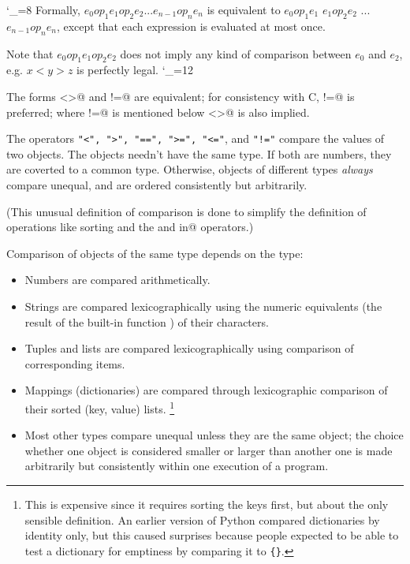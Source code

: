 \catcode`\_=8
Formally, $e_0 op_1 e_1 op_2 e_2 ...e_{n-1} op_n e_n$ is equivalent to
$e_0 op_1 e_1$ \verb@and@ $e_1 op_2 e_2$ \verb@and@ ... \verb@and@
$e_{n-1} op_n e_n$, except that each expression is evaluated at most once.

Note that $e_0 op_1 e_1 op_2 e_2$ does not imply any kind of comparison
between $e_0$ and $e_2$, e.g. $x < y > z$ is perfectly legal.
\catcode`\_=12

The forms \verb@<>@ and \verb@!=@ are equivalent; for consistency with
C, \verb@!=@ is preferred; where \verb@!=@ is mentioned below
\verb@<>@ is also implied.

The operators {\tt "<", ">", "==", ">=", "<="}, and {\tt "!="} compare
the values of two objects.  The objects needn't have the same type.
If both are numbers, they are coverted to a common type.  Otherwise,
objects of different types {\em always} compare unequal, and are
ordered consistently but arbitrarily.

(This unusual definition of comparison is done to simplify the
definition of operations like sorting and the \verb@in@ and
\verb@not in@ operators.)

Comparison of objects of the same type depends on the type:

\begin{itemize}

\item
Numbers are compared arithmetically.

\item
Strings are compared lexicographically using the numeric equivalents
(the result of the built-in function \verb@ord@) of their characters.

\item
Tuples and lists are compared lexicographically using comparison of
corresponding items.

\item
Mappings (dictionaries) are compared through lexicographic
comparison of their sorted (key, value) lists.%
\footnote{This is expensive since it requires sorting the keys first,
but about the only sensible definition.  An earlier version of Python
compared dictionaries by identity only, but this caused surprises
because people expected to be able to test a dictionary for emptiness
by comparing it to {\tt \{\}}.}

\item
Most other types compare unequal unless they are the same object;
the choice whether one object is considered smaller or larger than
another one is made arbitrarily but consistently within one
execution of a program.

\end{itemize}

